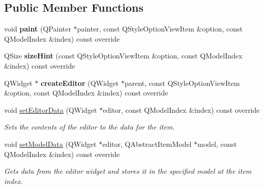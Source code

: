 \subsection*{Public Member Functions}
\begin{DoxyCompactItemize}
\item 
\mbox{\label{classrev_1_1_view_1_1_resource_delegate_a5a985520ff4a65807667ba246999edbe}} 
void {\bfseries paint} (Q\+Painter $\ast$painter, const Q\+Style\+Option\+View\+Item \&option, const Q\+Model\+Index \&index) const override
\item 
\mbox{\label{classrev_1_1_view_1_1_resource_delegate_af0a0a9f68581fd0595c53db5c0b9ce5a}} 
Q\+Size {\bfseries size\+Hint} (const Q\+Style\+Option\+View\+Item \&option, const Q\+Model\+Index \&index) const override
\item 
\mbox{\label{classrev_1_1_view_1_1_resource_delegate_a6d2eb94972b4258b4b03e87f41fc5f50}} 
Q\+Widget $\ast$ {\bfseries create\+Editor} (Q\+Widget $\ast$parent, const Q\+Style\+Option\+View\+Item \&option, const Q\+Model\+Index \&index) const override
\item 
void \mbox{\hyperlink{classrev_1_1_view_1_1_resource_delegate_a19d4bd6e52584f79bb705957401a382b}{set\+Editor\+Data}} (Q\+Widget $\ast$editor, const Q\+Model\+Index \&index) const override
\begin{DoxyCompactList}\small\item\em Sets the contents of the editor to the data for the item. \end{DoxyCompactList}\item 
\mbox{\label{classrev_1_1_view_1_1_resource_delegate_acb469205f151d7423be2c4ba358f04c1}} 
void \mbox{\hyperlink{classrev_1_1_view_1_1_resource_delegate_acb469205f151d7423be2c4ba358f04c1}{set\+Model\+Data}} (Q\+Widget $\ast$editor, Q\+Abstract\+Item\+Model $\ast$model, const Q\+Model\+Index \&index) const override
\begin{DoxyCompactList}\small\item\em Gets data from the editor widget and stores it in the specified model at the item index. \end{DoxyCompactList}\end{DoxyCompactItemize}


